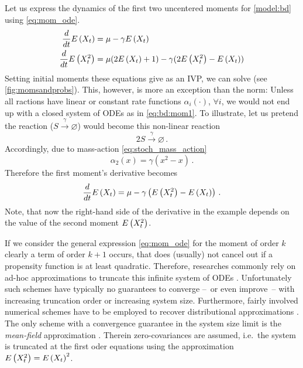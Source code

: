 \begin{example} Let us express the dynamics of the first two uncentered moments for \autoref{model:bd} using \eqref{eq:mom_ode}.
\begin{equation}\label{eq:bd:mom1}
    \begin{split}
    \frac{d}{dt}\E{X_t} =\; &\mu - \gamma \E{X_t}\\
    \frac{d}{dt}\E{X_t^2} =\; &\mu(2\E{X_t} + 1) - \gamma (2\E{X_t^2}-\E{X_t})%
    \end{split}
\end{equation}
Setting initial moments these equations give as an \ac{IVP}, we can solve (see \autoref{fig:momsandprobs}).
This, however, is more an exception than the norm:
Unless all ractions have linear or constant rate functions $\alpha_i(\cdot)$, $\forall i$, we would not end up with a closed system of \acp{ODE} as in \eqref{eq:bd:mom1}.
To illustrate, let us pretend the reaction ($S\xrightarrow{\gamma}\varnothing$) would become this non-linear reaction
    \[
2S\xrightarrow{\gamma}\varnothing\,.
\]
Accordingly, due to mass-action \eqref{eq:stoch_mass_action}
    \[
\alpha_2(x)=\gamma (x^2 - x)\,.
\]
Therefore the first moment's derivative becomes
    \[
\frac{d}{dt}{E}\left(X_t\right) =\mu - \gamma \left({E}\left(X_t^2\right) - {E}\left(X_t\right)\right)\,.
\]
Note, that now the right-hand side of the derivative in the example depends on the value of the second moment ${E}\left(X_t^2\right)$.
\end{example}
If we consider the general expression \eqref{eq:mom_ode} for the moment of order $k$ clearly a term of order $k+1$ occurs, that does (usually) not cancel out if a propensity function is at least
quadratic.
Therefore, researches commonly rely on ad-hoc approximations to truncate this infinite system of \acp{ODE} \parencite{hespanha2008moment,schnoerr2015,schnoerr2014validity}.
Unfortunately such schemes have typically no guarantees to converge --~or even improve~-- with increasing truncation order \parencite{schnoerr2014validity} or increasing system size.
Furthermore,
fairly involved numerical schemes have to be employed to recover distributional approximations \parencite{andreychenko2017distribution}.
The only scheme with a convergence guarantee in the system size limit is the \emph{mean-field} approximation \parencite{bortolussi2013continuous}.
Therein zero-covariances are assumed, i.e.\ the system is truncated at the first oder equations using the approximation ${E}\left(X_t^2\right)={E}\left(X_t\right)^2$.
